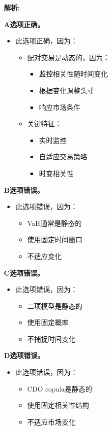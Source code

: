 \documentclass{article}
\newenvironment{explanation}
{\textbf{解析:}\par}
{\par}
\begin{document}
\begin{explanation}
    \textbf{A选项正确。}
    \begin{itemize}
        \item 此选项正确，因为：
        \begin{itemize}
            \item 配对交易是动态的，因为：
            \begin{itemize}
                \item 监控相关性随时间变化
                \item 根据变化调整头寸
                \item 响应市场条件
            \end{itemize}
            \item 关键特征：
            \begin{itemize}
                \item 实时监控
                \item 自适应交易策略
                \item 时变相关性
            \end{itemize}
        \end{itemize}
    \end{itemize}
    \textbf{B选项错误。}
    \begin{itemize}
        \item 此选项错误，因为：
        \begin{itemize}
            \item VaR通常是静态的
            \item 使用固定时间窗口
            \item 不适应变化
        \end{itemize}
    \end{itemize}
    \textbf{C选项错误。}
    \begin{itemize}
        \item 此选项错误，因为：
        \begin{itemize}
            \item 二项模型是静态的
            \item 使用固定概率
            \item 不捕捉时间变化
        \end{itemize}
    \end{itemize}
    \textbf{D选项错误。}
    \begin{itemize}
        \item 此选项错误，因为：
        \begin{itemize}
            \item CDO copula是静态的
            \item 使用固定相关性结构
            \item 不适应市场变化
        \end{itemize}
    \end{itemize}
\end{explanation}
\end{document}
